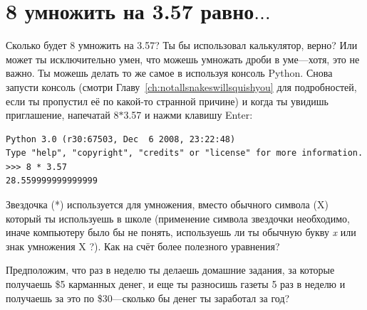 

\chapter{8 умножить на 3.57 равно$\ldots$}\label{ch:8multipliedby3.57}

Сколько будет 8 умножить на 3.57?  Ты бы использовал калькулятор, верно? Или может ты исключительно умен, что можешь умножать дроби в уме---хотя, это не важно. Ты можешь делать то же самое в используя консоль Python. Снова запусти консоль (смотри Главу~\ref{ch:notallsnakeswillsquishyou} для подробностей, если ты пропустил её по какой-то странной причине) и когда ты увидишь приглашение, напечатай 8$*$3.57 и нажми клавишу Enter:

\begin{listing}
\begin{verbatim}
Python 3.0 (r30:67503, Dec  6 2008, 23:22:48) 
Type "help", "copyright", "credits" or "license" for more information.
>>> 8 * 3.57
28.559999999999999
\end{verbatim}
\end{listing}

Звездочка (*) используется для умножения, вместо обычного символа (\textsf{X}) который ты используешь в школе (применение символа звездочки необходимо, иначе компьютеру было бы не понять, используешь ли ты обычную букву \emph{x} или знак умножения \textsf{X} ?).  Как на счёт более полезного уравнения?

Предположим, что раз в неделю ты делаешь домашние задания, за которые получаешь \$5 карманных денег, и еще ты разносишь газеты 5 раз в неделю и получаешь за это по \$30---сколько бы денег ты заработал за год?

